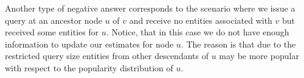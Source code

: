 Another type of negative answer corresponds to the scenario where we issue a query at an ancestor node $u$ of $v$ and receive no entities associated with $v$ but received some entities for $u$. Notice, that in this case we do not have enough information to update our estimates for node $u$. The reason is that due to the restricted query size entities from other descendants of $u$ may be more popular with respect to the popularity distribution of $u$.